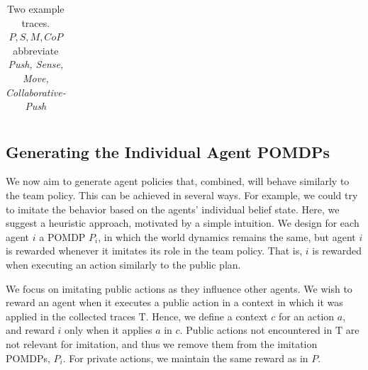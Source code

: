 \documentclass[runningheads]{llncs}
\newcommand{\Tau}{\mathrm{T}}
\begin{document}
\begin{example}
\begin{table}[t]
\begin{tabular}{|c||c|c|c|c||c|c||c|c|c|c|}
    \end{tabular}
    \caption{\label{tbl:Traces}Two example traces. $P,S,M,CoP$ abbreviate {\em Push, Sense, Move, Collaborative-Push}}
\end{table}

\end{example}





\subsection{Generating the Individual Agent POMDPs}
We now aim to generate agent policies that, combined, will behave similarly to the team policy. This can be achieved in several ways. For example, we could try to imitate the behavior based on the agents' individual belief state. Here, we suggest a heuristic approach, motivated by a simple intuition. We design  for each agent $i$ a POMDP $P_i$, in which the world dynamics remains the same, but agent $i$ is  rewarded whenever it imitates its role in the team policy. That is, $i$ is rewarded when executing an action similarly to the public plan. 

We focus on imitating public actions as they influence other agents. We wish to reward an agent when it executes
a public action 
in a context in which it was applied 
in the collected traces $\Tau$. 
Hence, we define a context $c$ for an action $a$, and reward $i$ only when it applies $a$ in $c$.
Public actions not encountered in $\Tau$ are not relevant for imitation, and thus we remove them from the imitation POMDPs, $P_i$. For private actions, we maintain the same reward as in $P$.
\end{document}
